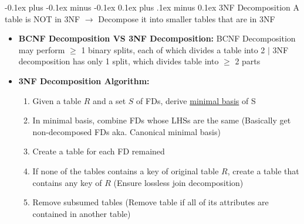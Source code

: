 \documentclass[landscape]{article}
\makeatletter
\renewcommand{\subsection}{\@startsection{subsection}{2}{0mm}%
  {-0.1ex plus -0.1ex minus -0.1ex}%
  {0.1ex plus .1ex minus 0.1ex}%
{\normalfont\scriptsize\bfseries}}
\makeatother
\begin{document}
\begin{multicols*}{5}
    \subsection{3NF Decomposition}
    A table is NOT in 3NF $\rightarrow$ Decompose it into smaller tables that are in 3NF
    \begin{itemize}
      \item \textbf{BCNF Decomposition VS 3NF Decomposition:} BCNF Decomposition may perform $\geq$ 1 binary splits, each of which divides a table into 2 $\vert$ 3NF decomposition has only 1 split, which divides table into $\geq$ 2 parts
      \item \textbf{3NF Decomposition Algorithm:}
      \begin{enumerate}
        \item Given a table $R$ and a set $S$ of FDs, derive \underline{minimal basis} of S
        \item In minimal basis, combine FDs whose LHSs are the same (Basically get non-decomposed FDs aka. Canonical minimal basis)
        \item Create a table for each FD remained
        \item If none of the tables contains a key of original table $R$, create a table that contains any key of $R$ (Ensure lossless join decomposition)
        \item Remove subsumed tables (Remove table if all of its attributes are contained in another table)
      \end{enumerate}
    \end{itemize}


\end{multicols*}
\end{document}
